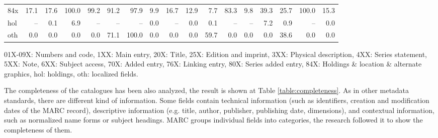 {\begin{landscape}
\begin{table}
\begin{minipage}{\columnwidth}
\begin{center}
\begin{tabular}{lrrrrrrrrrrrrrrrr}
84x & 17.1 & 17.6 & 100.0 & 99.2 & 91.2 & 97.9 & 9.9 & 16.7 & 12.9 & 7.7 & 83.3 & 9.8 & 39.3 & 25.7 & 100.0 & 15.3 \\
hol & -- & 0.1 & 6.9 & -- & -- & -- & 0.0 & -- & 0.0 & 0.1 & -- & -- & 7.2 & 0.9 & -- & 0.0 \\
oth & 0.0 & 0.0 & 0.0 & 0.0 & 71.1 & 100.0 & 0.0 & 0.0 & 0.0 & 59.7 & 0.0 & 0.0 & 0.0 & 38.6 & 0.0 & 0.0 \\
\bottomrule
\end{tabular}
\end{center}
\footnotesize
01X-09X: Numbers and code, 1XX: Main entry, 20X: Title, 25X: Edition and imprint, 3XX: Physical description, 4XX: Series statement, 5XX: Note, 6XX: Subject access, 70X: Added entry, 76X: Linking entry, 80X: Series added entry, 84X: Holdings \& location \& alternate graphics, hol: holdings, oth: localized fields.
\end{minipage}
\end{table}
    \end{landscape}
    \clearpage%
}

The completeness of the catalogues has been also analyzed, the result is shown at Table \ref{table:completeness}. As in other metadata standards, there are different kind of information. Some fields contain technical information (such as identifiers, creation and modification dates of the MARC record), descriptive information (e.g. title, author, publisher, publishing date, dimensions), and contextual information, such as normalized name forms or subject headings. MARC groups individual fields into categories, the research followed it to show the completeness of them.

